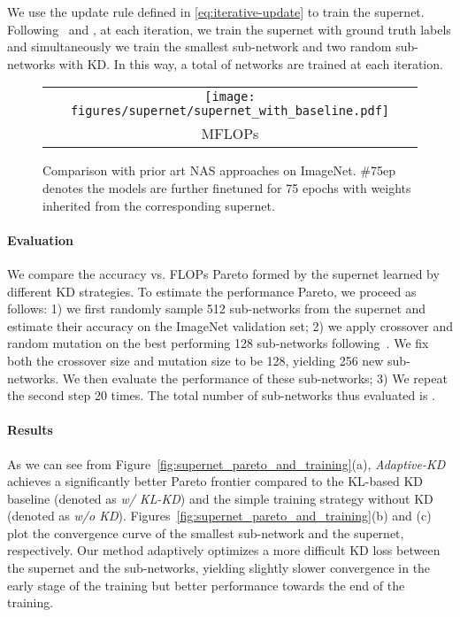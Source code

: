 \documentclass{article}
\begin{document}
We use the update rule defined in \eqref{eq:iterative-update} to train the supernet.
Following~\citet{wang2020attentivenas} and \citet{yu2020bignas}, 
at each iteration, 
we train the supernet with ground truth labels and simultaneously 
we train the smallest sub-network and two random sub-networks with KD. 
In this way, a total of  networks are trained at each iteration.

\begin{figure}[h]
\centering
\begin{tabular}{c}
\raisebox{2.5em}{\rotatebox{90}{Top-1 validation accuracy}}
\texttt{[image: figures/supernet/supernet\_with\_baseline.pdf]}
\\
\small MFLOPs\\
\end{tabular}
\caption{Comparison with prior art NAS approaches on ImageNet. 
\#75ep denotes the models are further finetuned for 75 epochs with weights inherited from the corresponding supernet.}
\label{fig:compare_with_sota}
\end{figure}

\paragraph{Evaluation}
We compare the accuracy vs. FLOPs Pareto formed by the supernet learned by different KD strategies. 
To estimate the performance Pareto, we proceed as follows: 
1) we first randomly sample 512 sub-networks from the supernet and estimate their accuracy on the ImageNet validation set;  
2) we apply crossover and random mutation on the best performing 128 sub-networks following~\citet{wang2020attentivenas}. 
We fix both the crossover size and mutation size to be 128, yielding 256 new sub-networks. We then evaluate the performance of these sub-networks; 
3) We repeat the second step 20 times. 
The total number of sub-networks thus evaluated is . 


\paragraph{Results}
As we can see from Figure~\ref{fig:supernet_pareto_and_training}(a), 
\emph{Adaptive-KD} achieves a significantly better Pareto frontier compared to the KL-based KD baseline (denoted as \emph{w/ KL-KD}) and 
the simple training strategy without KD (denoted as \emph{w/o KD}).
Figures~\ref{fig:supernet_pareto_and_training}(b) and (c) plot the convergence curve of the smallest sub-network and the supernet, respectively. 
Our method adaptively optimizes a more difficult KD loss between the supernet and the sub-networks, yielding slightly slower convergence in the early stage of the training but better performance towards the end of the training. 
\end{document}
